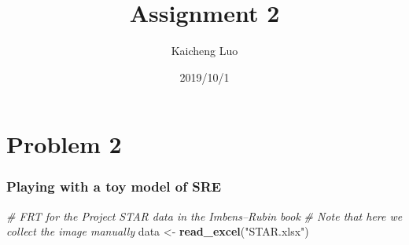 \documentclass[]{article}
\title{Assignment 2}
\author{Kaicheng Luo}
\date{2019/10/1}
\newenvironment{Shaded}{\begin{snugshade}}{\end{snugshade}}
\newcommand{\KeywordTok}[1]{\textcolor[rgb]{0.13,0.29,0.53}{\textbf{#1}}}
\newcommand{\StringTok}[1]{\textcolor[rgb]{0.31,0.60,0.02}{#1}}
\newcommand{\CommentTok}[1]{\textcolor[rgb]{0.56,0.35,0.01}{\textit{#1}}}
\newcommand{\NormalTok}[1]{#1}
\begin{document}
\maketitle

\section*{Problem 2}\subsubsection*{Playing with a toy model of SRE}

\begin{Shaded}
\begin{Highlighting}[]
\CommentTok{# FRT for the Project STAR data in the Imbens–Rubin book}
\CommentTok{# Note that here we collect the image manually}
\NormalTok{data <-}\StringTok{ }\KeywordTok{read_excel}\NormalTok{(}\StringTok{"STAR.xlsx"}\NormalTok{)}


\end{Highlighting}
\end{Shaded}
\end{document}
